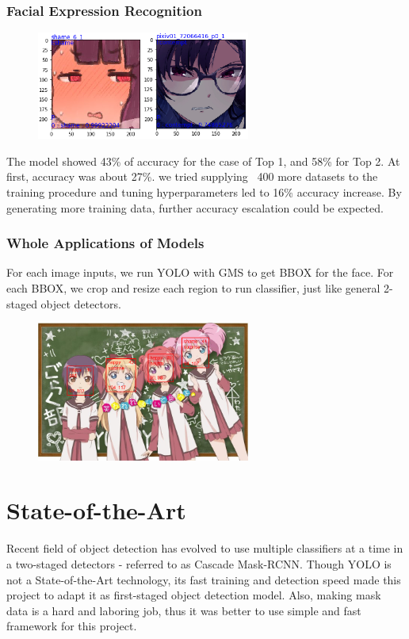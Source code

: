 \documentclass{article}
\begin{document}
\subsubsection{Facial Expression Recognition}
\begin{figure}[h]
  \centering
  \includegraphics[width=7cm]{image/classifier_example.png}
\end{figure}

The model showed 43\% of accuracy for the case of Top 1, and 58\% for Top 2. At
first, accuracy was about 27\%. we tried supplying ~400 more datasets to the
training procedure and tuning hyperparameters led to 16\% accuracy increase. By
generating more training data, further accuracy escalation could be expected.

\subsubsection{Whole Applications of Models}
For each image inputs, we run YOLO with GMS to get BBOX for the face. For each
BBOX, we crop and resize each region to run classifier, just like general
2-staged object detectors.

\begin{figure}[h]
  \centering
  \includegraphics[width=7cm]{image/yolo_class_example.png}
\end{figure}

\section{State-of-the-Art}
Recent field of object detection has evolved to use multiple classifiers at a
time in a two-staged detectors - referred to as Cascade Mask-RCNN. Though YOLO
is not a State-of-the-Art technology, its fast training and detection speed made
this project to adapt it as first-staged object detection model. Also, making
mask data is a hard and laboring job, thus it was better to use simple and fast
framework for this project.
\end{document}
